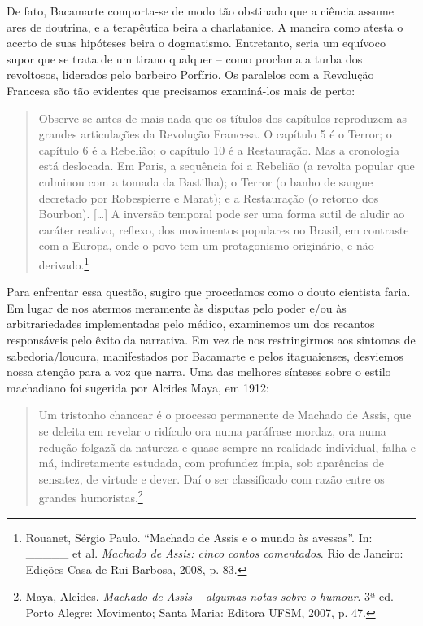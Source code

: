 De fato, Bacamarte comporta-se de modo tão obstinado que a ciência
assume ares de doutrina, e a terapêutica beira a charlatanice. A maneira
como atesta o acerto de suas hipóteses beira o dogmatismo. Entretanto,
seria um equívoco supor que se trata de um tirano qualquer -- como
proclama a turba dos revoltosos, liderados pelo barbeiro Porfírio. Os
paralelos com a Revolução Francesa são tão evidentes que precisamos
examiná-los mais de perto:

\begin{quote}
Observe-se antes de mais nada que os títulos dos capítulos reproduzem as
grandes articulações da Revolução Francesa. O capítulo 5 é o Terror; o
capítulo 6 é a Rebelião; o capítulo 10 é a Restauração. Mas a cronologia
está deslocada. Em Paris, a sequência foi a Rebelião (a revolta popular
que culminou com a tomada da Bastilha); o Terror (o banho de sangue
decretado por Robespierre e Marat); e a Restauração (o retorno dos
Bourbon). {[}\ldots{}{]} A inversão temporal pode ser uma forma sutil de
aludir ao caráter reativo, reflexo, dos movimentos populares no Brasil,
em contraste com a Europa, onde o povo tem um protagonismo originário, e
não derivado.\footnote{Rouanet, Sérgio Paulo. ``Machado de Assis e o
  mundo às avessas''. In: \_\_\_\_\_ et al. \emph{Machado de Assis:
  cinco contos comentados}. Rio de Janeiro: Edições Casa de Rui Barbosa,
  2008, p. 83.}
\end{quote}

Para enfrentar essa questão, sugiro que procedamos como o douto
cientista faria. Em lugar de nos atermos meramente às disputas pelo
poder e/ou às arbitrariedades implementadas pelo médico, examinemos um
dos recantos responsáveis pelo êxito da narrativa. Em vez de nos
restringirmos aos sintomas de sabedoria/loucura, manifestados por
Bacamarte e pelos itaguaienses, desviemos nossa atenção para a voz que
narra. Uma das melhores sínteses sobre o estilo machadiano foi sugerida
por Alcides Maya, em 1912:

\begin{quote}
Um tristonho chancear é o processo permanente de Machado de Assis, que
se deleita em revelar o ridículo ora numa paráfrase mordaz, ora numa
redução folgazã da natureza e quase sempre na realidade individual,
falha e má, indiretamente estudada, com profundez ímpia, sob aparências
de sensatez, de virtude e dever. Daí o ser classificado com razão entre
os grandes humoristas.\footnote{Maya, Alcides. \emph{Machado de Assis --
  algumas notas sobre o humour}. 3ª ed. Porto Alegre: Movimento; Santa
  Maria: Editora UFSM, 2007, p. 47.}
\end{quote}

